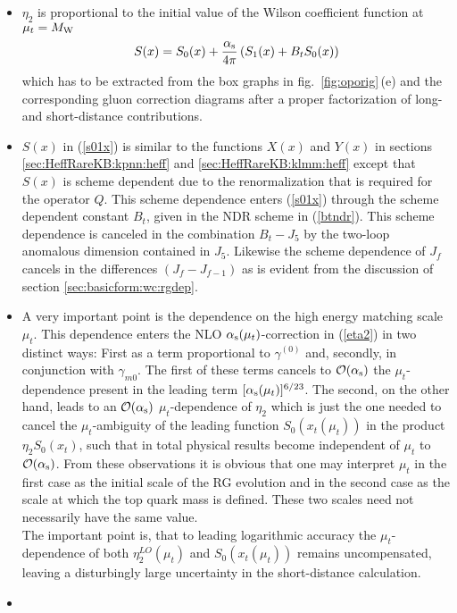 \begin{itemize}
\item
$\eta_2$ is proportional to the initial value of the Wilson
coefficient function at $\mu_t=M_{\rm W}$
\begin{equation}\label{s01x}
S(x)=S_0(x)+\frac{\alpha_{\rm s}}{4\pi}\left(S_1(x)+B_t S_0(x)\right)
\end{equation}
which has to be extracted from the box graphs in fig.\
\ref{fig:oporig}\,(e) and the corresponding gluon correction diagrams
after a proper factorization of long- and short-distance
contributions.
\item
$S(x)$ in (\ref{s01x}) is similar to the functions $X(x)$ and
$Y(x)$ in sections \ref{sec:HeffRareKB:kpnn:heff} and
\ref{sec:HeffRareKB:klmm:heff} except that $S(x)$ is scheme
dependent due to the renormalization that is required for the
operator $Q$. This scheme dependence enters (\ref{s01x}) through the
scheme dependent constant $B_t$, given in the NDR scheme in
(\ref{btndr}). This scheme dependence is canceled in the combination
$B_t-J_5$ by the two-loop anomalous dimension contained in $J_5$.
Likewise the scheme dependence of $J_f$ cancels in the differences
$(J_{f}-J_{f-1})$ as is evident from the discussion of section
\ref{sec:basicform:wc:rgdep}.
\item
A very important point is the dependence on the high energy matching
scale $\mu_t$. This dependence enters the NLO
$\alpha_{\rm s}(\mu_t)$-correction in (\ref{eta2}) in two distinct ways:
First as a term proportional to $\gamma^{(0)}$ and, secondly, in
conjunction with $\gamma_{m0}$. The first of these terms cancels to
${\cal O}(\alpha_{\rm s})$ the $\mu_t$-dependence present in the leading
term $[\alpha_{\rm s}(\mu_t)]^{6/23}$. The second, on the other hand, leads
to an ${\cal O}(\alpha_{\rm s})$ $\mu_t$-dependence of $\eta_2$ which is
just the one needed to cancel the $\mu_t$-ambiguity of the leading
function $S_0(x_t(\mu_t))$ in the product $\eta_2 S_0(x_t)$, such
that in total physical results become independent of $\mu_t$ to
${\cal O}(\alpha_{\rm s})$. From these observations it is obvious that one
may interpret $\mu_t$ in the first case as the initial scale of the
RG evolution and in the second case as the scale at which the top
quark mass is defined. These two scales need not necessarily have the
same value.
\\
The important point is, that to leading logarithmic accuracy the
$\mu_t$-de\-pen\-dence of both $\eta^{LO}_2(\mu_t)$ and
$S_0(x_t(\mu_t))$ remains uncompensated, leaving a dis\-tur\-bing\-ly
large uncertainty in the short-distance calculation.
\item

\end{itemize}
